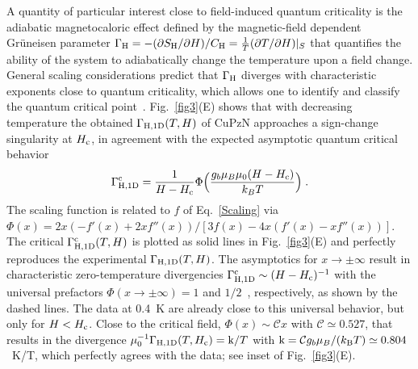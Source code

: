 \documentclass[12pt]{article}
\begin{document}
A quantity of particular interest close to field-induced quantum criticality is the adiabatic magnetocaloric effect defined by the magnetic-field dependent Gr\"uneisen parameter $\Gamma_{\rm H} = - (\partial S_{\rm H}/\partial H)/C_{\rm H} = \frac{1}{T} (\partial T/\partial H)|_S$  that quantifies the ability of the system to adiabatically change the temperature upon a field change.
General scaling considerations predict that $\Gamma_{\rm H}$ diverges with characteristic exponents close to quantum criticality, which allows one to identify and classify the quantum critical point~\cite{Zhu2003,Garst2005}. Fig.~\ref{fig3}(E) shows that with decreasing temperature  the obtained $\Gamma_{\rm H, 1D}(T,H)$ of CuPzN approaches a sign-change singularity at $H_{\rm c}$, in agreement with the expected asymptotic quantum critical behavior
%
\begin{align}
\Gamma^{\rm c}_{\rm H, 1D} = \frac{1}{H-H_{\rm c}} \Phi\Big(\frac{g_b  \mu_B \mu_0 (H-H_{\rm c})}{k_B T}\Big)\; .
\label{eq:Gamma_scal}
\end{align}
%
The scaling function is related to $f$ of Eq.~\eqref{Scaling} via $\Phi(x) = 2 x (-f'(x) + 2 x f''(x) ) /[3f(x) - 4 x (f'(x) - x f''(x))]$. The critical $\Gamma^{\rm c}_{\rm H, 1D}(T,H)$ is plotted as solid lines in Fig.~\ref{fig3}(E) and perfectly reproduces the experimental $\Gamma_{\rm H, 1D}(T,H)$. The asymptotics for $x\to \pm\infty$ result in characteristic zero-temperature divergencies $\Gamma^{\rm c}_{\rm H, 1D}\sim (H-H_{\rm c})^{-1}$ with the universal prefactors $\Phi(x\to \pm\infty)=1$ and $1/2$~\cite{Zhu2003}, respectively, as shown by the dashed lines.  The data at 0.4~K are already close to this universal behavior, but only for $H< H_{\rm c}$. Close to the critical field, $\Phi(x) \sim \mathcal{C} x$ with $\mathcal{C} \simeq 0.527$, that results in the  divergence $\mu_0^{-1}\Gamma_{\rm H, 1D}(T,H_{\rm c})={\rm k}/T$ with ${\rm k} = \mathcal{C}g_b  \mu_B/(k_{\rm B} T)\simeq 0.804$~K/T, which perfectly agrees with the data; see inset of Fig.~\ref{fig3}(E). 
\end{document}
